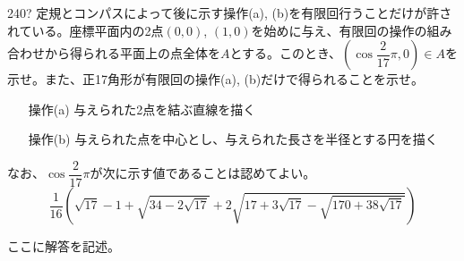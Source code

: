 \begin{thm}{240}{\hosi ?}{}
 定規とコンパスによって後に示す操作(a), (b)を有限回行うことだけが許されている。座標平面内の2点$(0,0)$, $(1,0)$を始めに与え、有限回の操作の組み合わせから得られる平面上の点全体を$A$とする。このとき、$(\cos\dfrac{2}{17}\pi,0)\in A$を示せ。また、正17角形が有限回の操作(a), (b)だけで得られることを示せ。

 \begin{itemize}
  \setlength{\leftskip}{3eM}
  \item[操作(a)] 与えられた2点を結ぶ直線を描く
  \item[操作(b)] 与えられた点を中心とし、与えられた長さを半径とする円を描く
 \end{itemize}

 なお、$\cos\dfrac{2}{17}\pi$が次に示す値であることは認めてよい。
 \[ \!\!\frac{1}{16}\!\!\left(\sqrt{17}-1+\sqrt{34-2\sqrt{17}}+2\sqrt{17+3\sqrt{17}-\sqrt{170+38\sqrt{17}}}\right) \]
\end{thm}

ここに解答を記述。